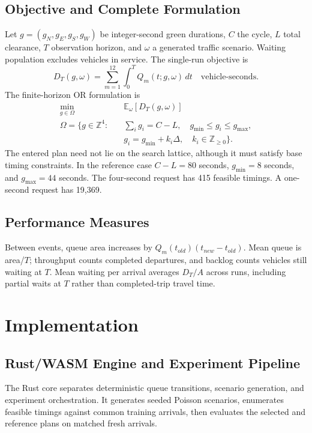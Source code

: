 \documentclass[12pt,a4paper]{report}
\begin{document}
\section{Objective and Complete Formulation}
Let $g=(g_N,g_E,g_S,g_W)$ be integer-second green durations, $C$ the cycle, $L$ total clearance, $T$ observation horizon, and $\omega$ a generated traffic scenario. Waiting population excludes vehicles in service. The single-run objective is
\begin{equation}\label{eq:waiting}
D_T(g,\omega)=\sum_{m=1}^{12}\int_0^T Q_m(t;g,\omega)\,dt
\quad\text{vehicle-seconds}.
\end{equation}
The finite-horizon OR formulation is
\begin{align}
\min_{g\in\Omega}\quad &\mathbb{E}_{\omega}[D_T(g,\omega)]\\
\Omega=\{g\in\mathbb{Z}^4:\quad
&\sum_i g_i=C-L,\quad g_{\min}\le g_i\le g_{\max},\\
&g_i=g_{\min}+k_i\Delta,\quad k_i\in\mathbb{Z}_{\ge0}\}.
\end{align}
The entered plan need not lie on the search lattice, although it must satisfy base timing constraints. In the reference case $C-L=80$ seconds, $g_{\min}=8$ seconds, and $g_{\max}=44$ seconds. The four-second request has 415 feasible timings. A one-second request has 19,369.

\section{Performance Measures}
Between events, queue area increases by $Q_m(t_{old})(t_{new}-t_{old})$. Mean queue is area/$T$; throughput counts completed departures, and backlog counts vehicles still waiting at $T$. Mean waiting per arrival averages $D_T/A$ across runs, including partial waits at $T$ rather than completed-trip travel time.

\chapter{Implementation}
\section{Rust/WASM Engine and Experiment Pipeline}
The Rust core separates deterministic queue transitions, scenario generation, and experiment orchestration. It generates seeded Poisson scenarios, enumerates feasible timings against common training arrivals, then evaluates the selected and reference plans on matched fresh arrivals.
\end{document}
